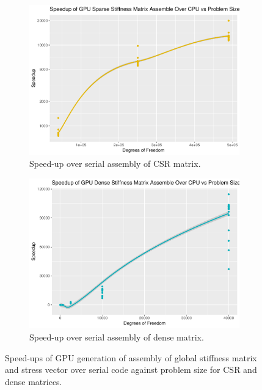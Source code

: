 \begin{figure}
	\centering
	\begin{subfigure}{0.48\linewidth}
		\centering
		\includegraphics[width = \linewidth]{Plots/assem_dev_cpu_sparse_speedup_vs_n}
		\caption{Speed-up over serial assembly of CSR matrix.}
		\label{fig:assem_sparse_n}
	\end{subfigure}\hfill
	\begin{subfigure}{0.48\linewidth}
		\centering
		\includegraphics[width=\linewidth]{Plots/assem_dev_cpu_dense_speedup_vs_n}
		\caption{Speed-up over serial assembly of dense matrix.}
		\label{fig:assem_dense_n}
	\end{subfigure}
	\caption{Speed-ups of GPU generation of assembly of global stiffness matrix and stress vector over serial code against problem size for CSR and dense matrices.}
	\label{fig:assem_su_n}
\end{figure}

